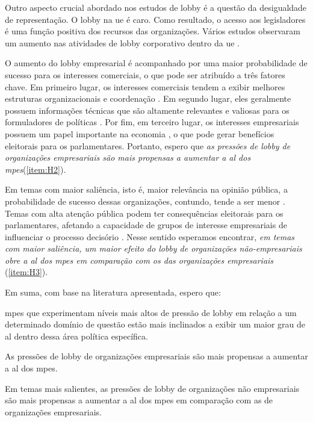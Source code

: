 Outro aspecto crucial abordado nos estudos de lobby é a questão da desigualdade de representação. O lobby na \acrshort{ue} é caro. Como resultado, o acesso aos legisladores é uma função positiva dos recursos das organizações. Vários estudos observaram um aumento nas atividades de lobby corporativo dentro da \acrshort{ue} \cite{Bouwen2002, Poletti2016, Berkhout2018, Hanegraaff2021}.

O aumento do lobby empresarial é acompanhado por uma maior probabilidade de sucesso para os interesses comerciais, o que pode ser atribuído a três fatores chave. Em primeiro lugar, os interesses comerciais tendem a exibir melhores estruturas organizacionais e coordenação \cite{olson1971logic}. Em segundo lugar, eles geralmente possuem informações técnicas que são altamente relevantes e valiosas para os formuladores de políticas \cite{kerwin2018rulemaking}. Por fim, em terceiro lugar, os interesses empresariais possuem um papel importante na economia \cite{lindblom1980politics}, o que pode gerar benefícios eleitorais para os parlamentares. Portanto, espero que \emph{as pressões de lobby de organizações empresariais são mais propensas a aumentar a \acrshort{al} dos \acrshort{mpe}s}(\ref{item:H2}).

Em temas com maior saliência, isto é, maior relevância na opinião pública, a probabilidade de sucesso dessas organizações, contundo, tende a ser menor \cite{caldeira2000lobbying, baumgartner2010agendas, bonardi2005corporate, mahoney_lobbying_2007}. Temas com alta atenção pública podem ter consequências eleitorais para os parlamentares, afetando a capacidade de grupos de interesse empresariais de influenciar o processo decisório \cite{mahoney_lobbying_2007, mahoney2008brussels}. Nesse sentido esperamos encontrar, \emph{em temas com maior saliência, um maior efeito do lobby de organizações não-empresariais obre a \acrshort{al} dos \acrshort{mpe}s em comparação com os das organizações empresariais} (\ref{item:H3}).

Em suma, com base na literatura apresentada, espero que:
\begin{hypotheses}
    \item \label{item:H1} \acrshort{mpe}s que experimentam níveis mais altos de pressão de lobby em relação a um determinado domínio de questão estão mais inclinados a exibir um maior grau de \acrshort{al} dentro dessa área política específica.
    
    \item \label{item:H2} As pressões de lobby de organizações empresariais são mais propensas a aumentar a \acrshort{al} dos \acrshort{mpe}s.
    
    \item \label{item:H3} Em temas mais salientes, as pressões de lobby de organizações não empresariais são mais propensas a aumentar a \acrshort{al} dos \acrshort{mpe}s em comparação com as de organizações empresariais.
\end{hypotheses}

